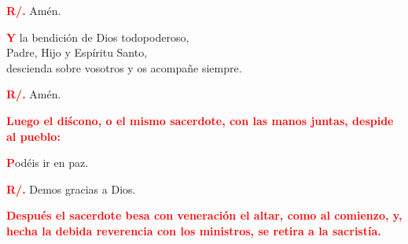 \documentclass[12pt, letterpaper]{report}
\begin{document}
\noindent
\Large {\bfseries \textcolor{red}{R/.}} \hspace{0.5cm} Am\'en.

\lettrine[lines=1]{\bfseries \textcolor{red}{Y}}{} \Large la bendici\'on de Dios todopoderoso, \\
Padre, Hijo \Huge{\textcolor{red}{}} \Large y Esp\'iritu Santo, \\
descienda sobre vosotros y os acompa\~ne siempre. \newline

\noindent
\Large {\bfseries \textcolor{red}{R/.}} \hspace{0.5cm} Am\'en.\newline

\newpage

\large{\bfseries \textcolor{red}{Luego el di\'scono, o el mismo sacerdote, con las manos juntas, despide al pueblo:}}\newline

\lettrine[lines=1]{\bfseries \textcolor{red}{P}}{}\Large od\'eis ir en paz. \newline

\noindent
\Large {\bfseries \textcolor{red}{R/.}} \hspace{0.5cm} Demos gracias a Dios. \newline

\large{\bfseries \textcolor{red}{Despu\'es el sacerdote besa con veneraci\'on el altar, como al comienzo, y, hecha la debida reverencia con los ministros, se retira a la sacrist\'ia.}}\newline

\end{document}
